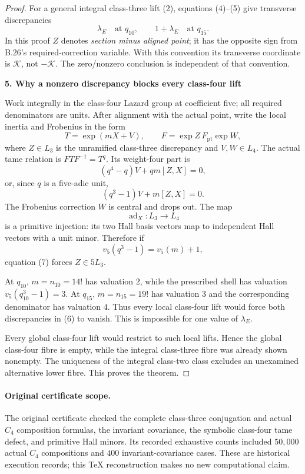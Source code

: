 \begin{proof}
For a general integral class-three lift (2), equations (4)--(5) give transverse discrepancies
\[
 \lambda_E\quad\text{at }q_{10},\qquad
 1+\lambda_E\quad\text{at }q_{15}.
 \tag{6}
\]
In this proof $Z$ denotes \emph{section minus aligned point}; it has the opposite sign from B.26's required-correction variable. With this convention its transverse coordinate is $\mathcal K$, not $-\mathcal K$. The zero/nonzero conclusion is independent of that convention.

\par\medskip\noindent\textbf{5. Why a nonzero discrepancy blocks every class-four lift}\par\nobreak\smallskip
Work integrally in the class-four Lazard group at coefficient five; all required denominators are units. After alignment with the actual point, write the local inertia and Frobenius in the form
\[
 T=\exp(mX+V),\qquad
 F=\exp Z\,F_{\mathrm{pt}}\exp W,
\]
where $Z\in L_3$ is the unramified class-three discrepancy and $V,W\in L_4$. The actual tame relation is $FTF^{-1}=T^q$. Its weight-four part is
\[
 (q^4-q)V+qm[Z,X]=0,
\]
or, since $q$ is a five-adic unit,
\[
 (q^3-1)V+m[Z,X]=0.
 \tag{7}
\]
The Frobenius correction $W$ is central and drops out. The map
\[
 \operatorname{ad}_X:L_3\longrightarrow L_4
\]
is a primitive injection: its two Hall basis vectors map to independent Hall vectors with a unit minor. Therefore if
\[
 v_5(q^3-1)=v_5(m)+1,
\]
equation (7) forces $Z\in5L_3$.

At $q_{10}$, $m=n_{10}=14!$ has valuation $2$, while the prescribed shell has valuation $v_5(q_{10}^3-1)=3$. At $q_{15}$, $m=n_{15}=19!$ has valuation $3$ and the corresponding denominator has valuation $4$. Thus every local class-four lift would force both discrepancies in (6) to vanish. This is impossible for one value of $\lambda_E$.

Every global class-four lift would restrict to such local lifts. Hence the global class-four fibre is empty, while the integral class-three fibre was already shown nonempty. The uniqueness of the integral class-two class excludes an unexamined alternative lower fibre. This proves the theorem.
\end{proof}

\paragraph{Original certificate scope.}
The original certificate checked the complete class-three conjugation and actual $C_4$ composition formulas, the invariant covariance, the symbolic class-four tame defect, and primitive Hall minors. Its recorded exhaustive counts included $50{,}000$ actual $C_4$ compositions and $400$ invariant-covariance cases. These are historical execution records; this TeX reconstruction makes no new computational claim.
